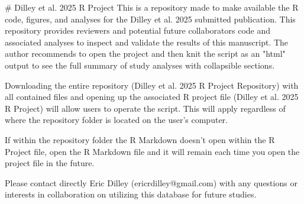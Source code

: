 # Dilley et al. 2025 R Project
This is a repository made to make available the R code, figures, and analyses for the Dilley et al. 2025 submitted publication.  This repository provides reviewers and potential future collaborators code and associated analyses to inspect and validate the results of this manuscript.  The author recommends to open the project and then knit the script as an "html" output to see the full summary of study analyses with collapsible sections.

Downloading the entire repository (Dilley et al. 2025 R Project Repository) with all contained files and opening up the associated R project file (Dilley et al. 2025 R Project) will allow users to operate the script.  This will apply regardless of where the repository folder is located on the user's computer.

If within the repository folder the R Markdown doesn't open within the R Project file, open the R Markdown file and it will remain each time you open the project file in the future.

Please contact directly Eric Dilley (ericrdilley@gmail.com) with any questions or interests in collaboration on utilizing this database for future studies.  